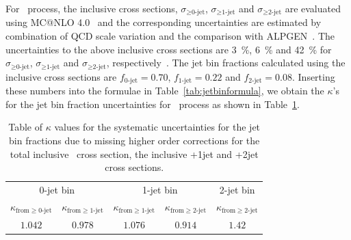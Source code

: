 \begin{table}[!htbp]
\begin{center}
\end{center}
\end{table}

For \qqww\ process, the inclusive cross sections, $\sigma_{\ge\textrm{0-jet}}$,
$\sigma_{\ge\textrm{1-jet}}$ and $\sigma_{\ge\textrm{2-jet}}$ are evaluated using 
MC@NLO 4.0~\cite{Frixione:2002ik} 
and the corresponding uncertainties are estimated by combination of  
QCD scale variation and the comparison with ALPGEN~\cite{Mangano:2002ea}. 
The uncertainties to the above inclusive cross sections are 3~\%,  6~\% and 42~\% for  
$\sigma_{\ge\textrm{0-jet}}$, $\sigma_{\ge\textrm{1-jet}}$ 
and $\sigma_{\ge\textrm{2-jet}}$, respectively~\cite{Dittmaier:2012vm}.  
The jet bin fractions calculated using the inclusive cross sections are 
$f_{\textrm{0-jet}}=0.70$, $f_{\textrm{1-jet}}=0.22$ and $f_{\textrm{2-jet}}=0.08$.
Inserting these numbers into the formulae in Table~\ref{tab:jetbinformula}, 
we obtain the $\kappa$'s for the jet bin fraction uncertainties for \qqww\ process
as shown in Table~\ref{tab:jetbinexcl_ww}. 
%
\begin{table}[!htbp]
\begin{center}
\vspace{0.5cm} 
\caption{ Table of $\kappa$ values for the systematic uncertainties for the jet bin
fractions due to missing higher order corrections for the total inclusive \qqww\
cross section, the inclusive \qqww+1jet and \qqww+2jet
cross sections. }
\vspace{0.5cm} 
\begin{tabular}{cc|cc|c}
\hline
\multicolumn{2}{c|}{0-jet bin}  & \multicolumn{2}{c|}{1-jet bin}  & 2-jet bin \\
$\kappa_{\mathrm{from } \ge \textrm{0-jet}}$ & $\kappa_{\mathrm{from } \ge \textrm{1-jet}}$
& $\kappa_{\mathrm{from } \ge \textrm{1-jet}}$ & $\kappa_{\mathrm{from } \ge \textrm{2-jet}}$
& $\kappa_{\mathrm{from } \ge \textrm{2-jet}}$   \\
\hline \hline
$1.042$  & $ 0.978$  & $ 1.076$  & $ 0.914$  & $ 1.42$  \\
\hline
\end{tabular}
\label{tab:jetbinexcl_ww}
\end{center}
\end{table}



